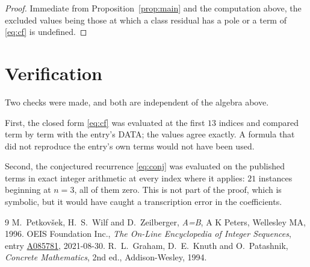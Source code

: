 \documentclass[11pt,a4paper]{article}
\theoremstyle{plain}
\theoremstyle{definition}
\begin{document}
\begin{proof}
Immediate from Proposition~\ref{prop:main} and the computation above, the excluded values
being those at which a class residual has a pole or a term of \eqref{eq:cf} is undefined.
\end{proof}

\section{Verification}

Two checks were made, and both are independent of the algebra above.

First, the closed form \eqref{eq:cf} was evaluated at the first $13$ indices and
compared term by term with the entry's DATA; the values agree exactly. A formula that did
not reproduce the entry's own terms would not have been used.

Second, the conjectured recurrence \eqref{eq:conj} was evaluated on the published terms in
exact integer arithmetic at every index where it applies: $21$ instances beginning at
$n=3$, all of them zero. This is not part of the proof, which is symbolic, but it
would have caught a transcription error in the coefficients.

\begin{thebibliography}{9}
 M.~Petkov\v{s}ek, H.~S.~Wilf and D.~Zeilberger, \emph{A=B}, A K Peters,
Wellesley MA, 1996.
 OEIS Foundation Inc., \emph{The On-Line Encyclopedia of Integer Sequences},
entry \href{https://oeis.org/A085781}{A085781}, 2021-08-30.
 R.~L.~Graham, D.~E.~Knuth and O.~Patashnik, \emph{Concrete Mathematics},
2nd ed., Addison-Wesley, 1994.
\end{thebibliography}
\end{document}
